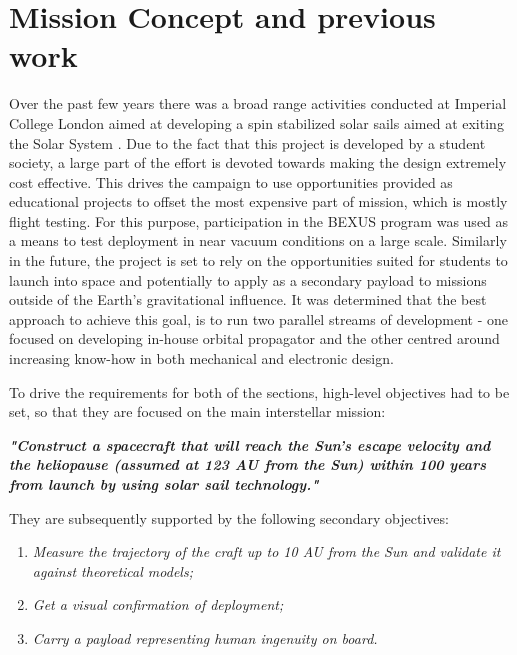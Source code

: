 \documentclass[final,3p,times,twocolumn]{elsarticle}
\begin{document}
\section{Mission Concept and previous work}
\noindent Over the past few years there was a broad range activities conducted at Imperial College London aimed at developing a spin stabilized solar sails aimed at exiting the Solar System \citep{isss1,jbis}. Due to the fact that this project is developed by a student society, a large part of the effort is devoted towards making the design extremely cost effective. This drives the campaign to use opportunities provided as educational projects to offset the most expensive part of mission, which is mostly flight testing. For this purpose, participation in the BEXUS program was used as a means to test deployment in near vacuum conditions on a large scale. Similarly in the future, the project is set to rely on the opportunities suited for students to launch into space and potentially to apply as a secondary payload to missions outside of the Earth's gravitational influence. It was determined that the best approach to achieve this goal, is to run two parallel streams of development - one focused on developing in-house orbital propagator and the other centred around increasing know-how in both mechanical and electronic design.
\vspace{5pt}
\par\noindent To drive the requirements for both of the sections, high-level objectives had to be set, so that they are focused on the main interstellar mission:

\begin{center}
    \emph{\textbf{"Construct a spacecraft that will reach the Sun's escape velocity and the heliopause (assumed at 123 AU from the Sun) within 100 years from launch by using solar sail technology."}}
\end{center}

\noindent They are subsequently supported by the following secondary objectives:
    \begin{enumerate}
        \item \emph{Measure the trajectory of the craft up to 10 AU from the Sun and validate it against theoretical models;}
        \item \emph{Get a visual confirmation of deployment;}
        \item \emph{Carry a payload representing human ingenuity on board.}
    \end{enumerate}
\end{document}

